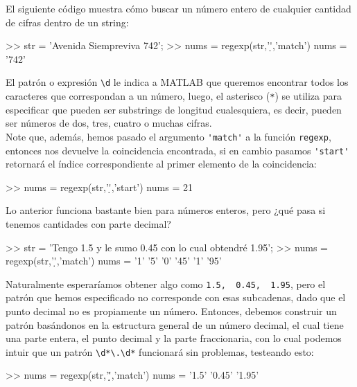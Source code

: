 El siguiente código muestra cómo buscar un número entero de cualquier
cantidad de cifras dentro de un string:

\begin{matlab}
>> str = 'Avenida Siempreviva 742';
>> nums = regexp(str,'\d*','match')
nums = 
    '742'
\end{matlab}

El patrón o expresión \verb|\d| le indica a MATLAB que
queremos encontrar todos los caracteres que correspondan a un número,
luego, el asterisco (\texttt{*}) se utiliza para especificar que pueden
ser substrings de longitud cualesquiera, es decir, pueden ser números de
dos, tres, cuatro o muchas cifras. \\

Note que, además, hemos pasado el argumento
\verb|'match'| a la función
\texttt{regexp}, entonces nos devuelve la coincidencia encontrada, si en
cambio pasamos \verb|'start'|
retornará el índice correspondiente al primer elemento de la
coincidencia:

\begin{matlab}
>> nums = regexp(str,'\d*','start')
nums =
    21
\end{matlab}

Lo anterior funciona bastante bien para números enteros, pero ¿qué pasa
si tenemos cantidades con parte decimal?

\begin{matlab}
>> str = 'Tengo 1.5 y le sumo 0.45 con lo cual obtendré 1.95';
>> nums = regexp(str,'\d*','match')
nums = 
    '1'    '5'    '0'    '45'    '1'    '95'
\end{matlab}

Naturalmente esperaríamos obtener algo como
\texttt{\textquotesingle{}1.5\textquotesingle{},\ \ \textquotesingle{}0.45\textquotesingle{},\ \ \textquotesingle{}1.95\textquotesingle{}},
pero el patrón que hemos especificado no corresponde con esas
subcadenas, dado que el punto decimal no es propiamente un número.
Entonces, debemos construir un patrón basándonos en la estructura
general de un número decimal, el cual tiene una parte entera, el punto
decimal y la parte fraccionaria, con lo cual podemos intuir que un
patrón \texttt{\textbackslash{}d*\textbackslash{}.\textbackslash{}d*}
funcionará sin problemas, testeando esto:

\begin{matlab}
>> nums = regexp(str,'\d*\.\d*','match')
nums = 
    '1.5'    '0.45'    '1.95'
\end{matlab}

